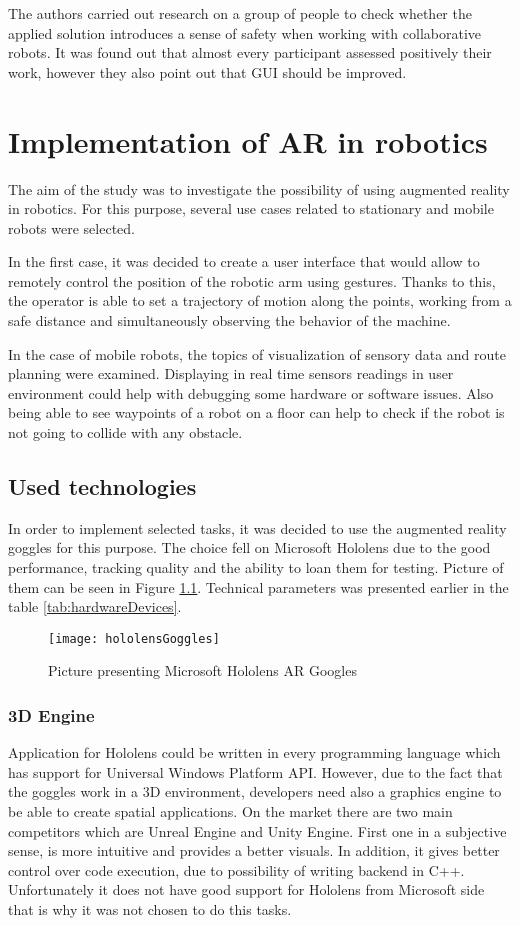 \documentclass[printmode,en]{mgr}
\begin{document}
The authors carried out research on a group of people to check whether the applied solution introduces a sense of safety when working with collaborative robots. It was found out that almost every participant assessed positively their work, however they also point out that GUI should be improved.

\chapter{Implementation of AR in robotics}
The aim of the study was to investigate the possibility of using augmented reality in robotics. For this purpose, several use cases related to stationary and mobile robots were selected.

In the first case, it was decided to create a user interface that would allow to remotely control the position of the robotic arm using gestures. Thanks to this, the operator is able to set a trajectory of motion along the points, working from a safe distance and simultaneously observing the behavior of the machine.

In the case of mobile robots, the topics of visualization of sensory data and route planning were examined. Displaying in real time sensors readings in user environment could help with debugging some hardware or software issues. Also being able to see waypoints of a robot on a floor can help to check if the robot is not going to collide with any obstacle.

\section{Used technologies}
In order to implement selected tasks, it was decided to use the augmented reality goggles for this purpose. The choice fell on Microsoft Hololens due to the good performance, tracking quality and the ability to loan them for testing. Picture of them can be seen in Figure \ref{fig:hololensGoggles}. Technical parameters was presented earlier in the table \ref{tab:hardwareDevices}.

\begin{figure}[!ht]
  \centering
    \texttt{[image: hololensGoggles]}
  \caption{Picture presenting Microsoft Hololens AR Googles \cite{hololensGoggles}}
  \label{fig:hololensGoggles}
\end{figure}

\subsection{3D Engine}
Application for Hololens could be written in every programming language which has support for Universal Windows Platform API. However, due to the fact that the goggles work in a 3D environment, developers need also a graphics engine to be able to create spatial applications. On the market there are two main competitors which are Unreal Engine and Unity Engine. First one in a subjective sense, is more intuitive and provides a better visuals. In addition, it gives better control over code execution, due to possibility of writing backend in C++. Unfortunately it does not have good support for Hololens from Microsoft side that is why it was not chosen to do this tasks.
\end{document}
